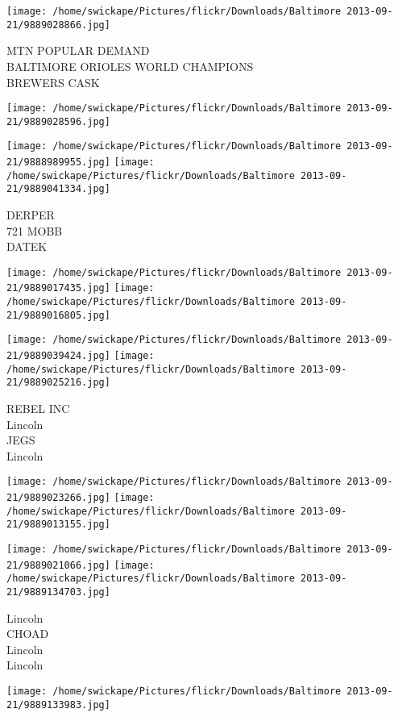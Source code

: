 \documentclass[10pt,letterpaper]{article}
\begin{document}
\texttt{[image: /home/swickape/Pictures/flickr/Downloads/Baltimore 2013-09-21/9889028866.jpg]}

MTN POPULAR DEMAND\\
BALTIMORE ORIOLES WORLD CHAMPIONS\\
BREWERS CASK
\pagebreak

\texttt{[image: /home/swickape/Pictures/flickr/Downloads/Baltimore 2013-09-21/9889028596.jpg]}

\vspace{0.25in}
\texttt{[image: /home/swickape/Pictures/flickr/Downloads/Baltimore 2013-09-21/9888989955.jpg]}
\texttt{[image: /home/swickape/Pictures/flickr/Downloads/Baltimore 2013-09-21/9889041334.jpg]}

DERPER\\
721 MOBB\\
DATEK
\pagebreak

\texttt{[image: /home/swickape/Pictures/flickr/Downloads/Baltimore 2013-09-21/9889017435.jpg]}
\texttt{[image: /home/swickape/Pictures/flickr/Downloads/Baltimore 2013-09-21/9889016805.jpg]}

\texttt{[image: /home/swickape/Pictures/flickr/Downloads/Baltimore 2013-09-21/9889039424.jpg]}
\texttt{[image: /home/swickape/Pictures/flickr/Downloads/Baltimore 2013-09-21/9889025216.jpg]}

REBEL INC\\
Lincoln\\
JEGS\\
Lincoln
\pagebreak

\texttt{[image: /home/swickape/Pictures/flickr/Downloads/Baltimore 2013-09-21/9889023266.jpg]}
\texttt{[image: /home/swickape/Pictures/flickr/Downloads/Baltimore 2013-09-21/9889013155.jpg]}

\texttt{[image: /home/swickape/Pictures/flickr/Downloads/Baltimore 2013-09-21/9889021066.jpg]}
\texttt{[image: /home/swickape/Pictures/flickr/Downloads/Baltimore 2013-09-21/9889134703.jpg]}

Lincoln\\
CHOAD\\
Lincoln\\
Lincoln
\pagebreak

\texttt{[image: /home/swickape/Pictures/flickr/Downloads/Baltimore 2013-09-21/9889133983.jpg]}
\end{document}
